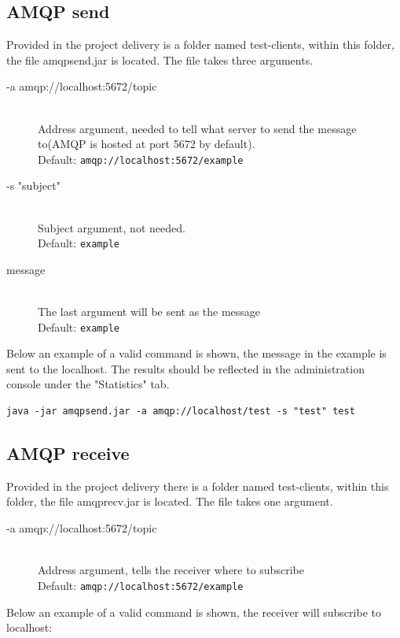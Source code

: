 \subsection{AMQP send}
\label{subsec:test_clients-amqp_send}
Provided in the project delivery is a folder named test-clients, within this folder, the file amqpsend.jar is located. The file takes three arguments.

\begin{description}
    \item[-a amqp://localhost:5672/topic] \hfill \\
  Address argument, needed to tell what server to send the message to(AMQP is hosted at port 5672 by default). \hfill \\ Default: \verb!amqp://localhost:5672/example!
    \item[-s "subject"] \hfill \\
  Subject argument, not needed. \hfill \\ Default: \verb!example!
    \item[message] \hfill \\
  The last argument will be sent as the message \hfill \\ Default: \verb!example!
\end{description}
Below an example of a valid command is shown, the message in the example is sent to the localhost. The results should be reflected in the administration console under the "Statistics" tab.

\begin{verbatim}
java -jar amqpsend.jar -a amqp://localhost/test -s "test" test
\end{verbatim}

\subsection{AMQP receive}
\label{subsec:test_clients-amqp_receive}
Provided in the project delivery there is a folder named test-clients, within this folder, the file amqprecv.jar is located. The file takes one argument.
 
\begin{description}
    \item[-a amqp://localhost:5672/topic] \hfill \\
  Address argument, tells the receiver where to subscribe \hfill \\ Default: \verb!amqp://localhost:5672/example!
\end{description}
Below an example of a valid command is shown, the receiver will subscribe to localhost:

